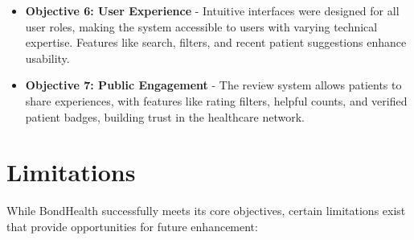 \begin{itemize}
    \item \textbf{Objective 6: User Experience} - Intuitive interfaces were designed for all user roles, making the system accessible to users with varying technical expertise. Features like search, filters, and recent patient suggestions enhance usability.
    
    \item \textbf{Objective 7: Public Engagement} - The review system allows patients to share experiences, with features like rating filters, helpful counts, and verified patient badges, building trust in the healthcare network.
\end{itemize}

\section{Limitations}
While BondHealth successfully meets its core objectives, certain limitations exist that provide opportunities for future enhancement:

